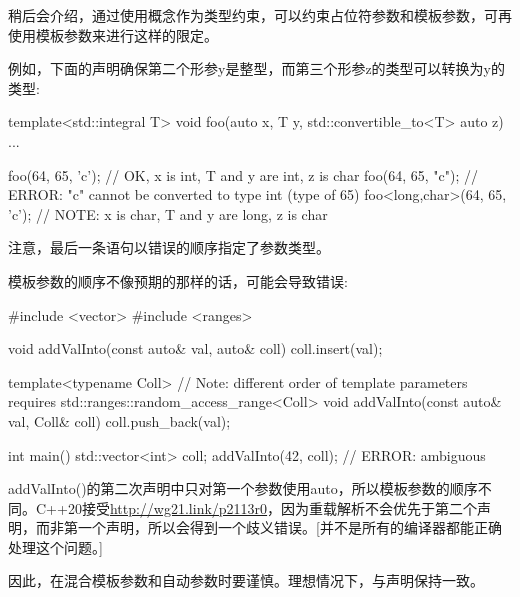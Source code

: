稍后会介绍，通过使用概念作为类型约束，可以约束占位符参数和模板参数，可再使用模板参数来进行这样的限定。

例如，下面的声明确保第二个形参y是整型，而第三个形参z的类型可以转换为y的类型:

\begin{cpp}
template<std::integral T>
void foo(auto x, T y, std::convertible_to<T> auto z)
{
	...
}

foo(64, 65, 'c'); // OK, x is int, T and y are int, z is char
foo(64, 65, "c"); // ERROR: "c" cannot be converted to type int (type of 65)
foo<long,char>(64, 65, 'c'); // NOTE: x is char, T and y are long, z is char
\end{cpp}

注意，最后一条语句以错误的顺序指定了参数类型。

模板参数的顺序不像预期的那样的话，可能会导致错误:


\begin{cpp}
#include <vector>
#include <ranges>

void addValInto(const auto& val, auto& coll)
{
	coll.insert(val);
}

template<typename Coll> // Note: different order of template parameters
requires std::ranges::random_access_range<Coll>
void addValInto(const auto& val, Coll& coll)
{
	coll.push_back(val);
}

int main()
{
	std::vector<int> coll;
	addValInto(42, coll); // ERROR: ambiguous
}
\end{cpp}

addValInto()的第二次声明中只对第一个参数使用auto，所以模板参数的顺序不同。C++20接受\url{http://wg21.link/p2113r0}，因为重载解析不会优先于第二个声明，而非第一个声明，所以会得到一个歧义错误。[并不是所有的编译器都能正确处理这个问题。]

因此，在混合模板参数和自动参数时要谨慎。理想情况下，与声明保持一致。











